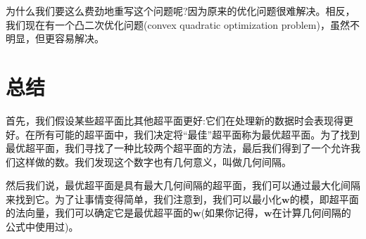为什么我们要这么费劲地重写这个问题呢?因为原来的优化问题很难解决。相反，我们现在有一个凸二次优化问题(convex quadratic optimization problem)，虽然不明显，但更容易解决。

\section{总结}

首先，我们假设某些超平面比其他超平面更好:它们在处理新的数据时会表现得更好。在所有可能的超平面中，我们决定将“最佳”超平面称为最优超平面。为了找到最优超平面，我们寻找了一种比较两个超平面的方法，最后我们得到了一个允许我们这样做的数。我们发现这个数字也有几何意义，叫做几何间隔。

然后我们说，最优超平面是具有最大几何间隔的超平面，我们可以通过最大化间隔来找到它。为了让事情变得简单，我们注意到，我们可以最小化$\mathbf{w}$的模，即超平面的法向量，我们可以确定它是最优超平面的$\mathbf{w}$(如果你记得，$\mathbf{w}$在计算几何间隔的公式中使用过)。